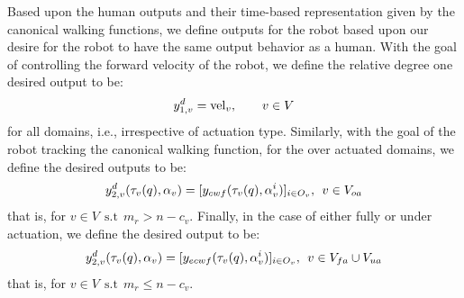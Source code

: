 
 Based upon the human outputs and their time-based representation given by the canonical walking functions, we define outputs for the robot based upon our desire for the robot to have the same output behavior as a human. With the goal of controlling the forward velocity of the robot, we define the relative degree one desired output to be:
\begin{align}
 y^d_{1,v} = \mathrm{vel}_v, \qquad v \in V
\end{align}
for all domains, i.e., irrespective of actuation type.  Similarly, with the goal of the robot tracking the canonical walking function, for the over actuated domains, we define the desired outputs to be:
\begin{align}
 y^d_{2,v}(\tau_v(q),\alpha_v) = [y_{cwf}(\tau_v(q),\alpha_v^i)]_{i \in O_v}, \:\: v \in V_{oa}
\end{align}
that is, for $v \in  V \:\: \mathrm{s.t} \:\: m_r > n - c_v$.  Finally, in the case of either fully or under actuation, we define the desired output to be:
\begin{align}
 y^d_{2,v}(\tau_v(q),\alpha_v) = [y_{ecwf}(\tau_v(q),\alpha_v^i)]_{i \in O_v}, \:\: v \in V_{fa} \cup V_{ua}
\end{align}
that is, for $v \in V \:\: \mathrm{s.t} \:\: m_r \leq n - c_v$. 
%
%

